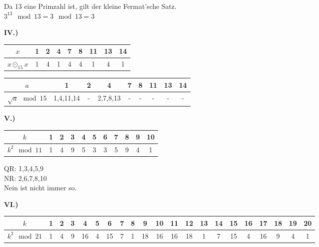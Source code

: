 \documentclass[12pt]{scrartcl}
\begin{document}
Da 13 eine Primzahl ist, gilt der kleine Fermat'sche Satz.\\
$3^{13} \mod 13 = 3 \mod 13 = 3$

\vspace{1.5cm}
\textbf{IV.)}\\

\begin{center}
    \begin{tabular}{ c || c | c | c | c | c | c | c | c  }
        $x$                 & 1 & 2 & 4 & 7 & 8 & 11 & 13 & 14\\ 
        \hline
        $x \odot_{15} x$    & 1 & 4 & 1 & 4 & 4 & 1 & 4 & 1\\ 
    \end{tabular}
\end{center}

\begin{center}
    \begin{tabular}{ c || c | c | c | c | c | c | c | c  }
        $a$                 & 1 & 2 & 4 & 7 & 8 & 11 & 13 & 14\\ 
        \hline
        $\sqrt{a} \mod 15$  & 1,4,11,14 & - & 2,7,8,13 & - & - & - & - & -\\ 
    \end{tabular}
\end{center}


\newpage
\textbf{V.)}\\
\begin{center}
    \begin{tabular}{ c || c | c | c | c | c | c | c | c | c | c  }
        $k$             & 1 & 2 & 3 & 4 & 5 & 6 & 7 & 8 & 9 & 10\\ 
        \hline
        $k^2 \mod 11 $  & 1 & 4 & 9 & 5 & 3 & 3 & 5 & 9 & 4 & 1\\ 
    \end{tabular}
\end{center}

QR: 1,3,4,5,9\\
NR: 2,6,7,8,10\\

Nein ist nicht immer so.

\vspace{1.3cm}
\textbf{VI.)}\\
\begin{center}
    \begin{tabular}{ c || c | c | c | c | c | c | c | c | c | c | c | c | c | c | c | c | c | c | c | c}
        $k$             & 1 & 2 & 3 & 4 & 5 & 6 & 7 & 8 & 9 & 10 & 11 & 12 & 13 & 14 & 15 & 16 & 17 & 18 & 19 & 20\\ 
        \hline
        $k^2 \mod 21 $  & 1 & 4 & 9 & 16 & 4 & 15 & 7 & 1 & 18 & 16 & 16 & 18 & 1 & 7 & 15 & 4 & 16 & 9 & 4 & 1\\ 
    \end{tabular}
\end{center}
\end{document}
